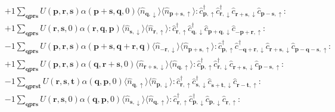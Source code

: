 \begin{align*}
	&+1 \sum_{ \mathbf{q} \mathbf{p} \mathbf{r} \mathbf{s} } U( \mathbf{p}, \mathbf{r}, \mathbf{s} )  \alpha( \mathbf{p}+\mathbf{s}, \mathbf{q}, 0 )   \langle \hat{n}_{ \mathbf{q}, \downarrow } \rangle \langle \hat{n}_{ \mathbf{p}+\mathbf{s}, \uparrow } \rangle :\hat{c}_{ \mathbf{p}, \uparrow }^\dagger \hat{c}_{ \mathbf{r}, \downarrow }^\dagger \hat{c}_{ \mathbf{r}+\mathbf{s}, \downarrow }^{\phantom{\dagger}}\hat{c}_{ \mathbf{p}-\mathbf{s}, \uparrow }^{\phantom{\dagger}}: \\
	&+1 \sum_{ \mathbf{q} \mathbf{p} \mathbf{r} \mathbf{s} } U( \mathbf{r}, \mathbf{s}, 0 )  \alpha( \mathbf{r}, \mathbf{q}, \mathbf{p} )   \langle \hat{n}_{ \mathbf{s}, \downarrow } \rangle \langle \hat{n}_{ \mathbf{r}, \uparrow } \rangle :\hat{c}_{ \mathbf{r}, \uparrow }^\dagger \hat{c}_{ \mathbf{q}, \downarrow }^\dagger \hat{c}_{ \mathbf{p}+\mathbf{q}, \downarrow }^{\phantom{\dagger}}\hat{c}_{ -\mathbf{p}+\mathbf{r}, \uparrow }^{\phantom{\dagger}}: \\
	&-1 \sum_{ \mathbf{q} \mathbf{p} \mathbf{r} \mathbf{s} } U( \mathbf{p}, \mathbf{r}, \mathbf{s} )  \alpha( \mathbf{p}+\mathbf{s}, \mathbf{q}+\mathbf{r}, \mathbf{q} )   \langle \hat{n}_{ -\mathbf{r}, \downarrow } \rangle \langle \hat{n}_{ \mathbf{p}+\mathbf{s}, \uparrow } \rangle :\hat{c}_{ \mathbf{p}, \uparrow }^\dagger \hat{c}_{ -\mathbf{q}+\mathbf{r}, \downarrow }^\dagger \hat{c}_{ \mathbf{r}+\mathbf{s}, \downarrow }^{\phantom{\dagger}}\hat{c}_{ \mathbf{p}-\mathbf{q}-\mathbf{s}, \uparrow }^{\phantom{\dagger}}: \\
	&+1 \sum_{ \mathbf{q} \mathbf{p} \mathbf{r} \mathbf{s} } U( \mathbf{p}, \mathbf{r}, \mathbf{s} )  \alpha( \mathbf{q}, \mathbf{r}+\mathbf{s}, 0 )   \langle \hat{n}_{ \mathbf{r}+\mathbf{s}, \downarrow } \rangle \langle \hat{n}_{ \mathbf{q}, \uparrow } \rangle :\hat{c}_{ \mathbf{p}, \uparrow }^\dagger \hat{c}_{ \mathbf{r}, \downarrow }^\dagger \hat{c}_{ \mathbf{r}+\mathbf{s}, \downarrow }^{\phantom{\dagger}}\hat{c}_{ \mathbf{p}-\mathbf{s}, \uparrow }^{\phantom{\dagger}}: \\
	&-1 \sum_{ \mathbf{q} \mathbf{p} \mathbf{r} \mathbf{s} \mathbf{t} } U( \mathbf{r}, \mathbf{s}, \mathbf{t} )  \alpha( \mathbf{q}, \mathbf{p}, 0 )   \langle \hat{n}_{ \mathbf{q}, \uparrow } \rangle \langle \hat{n}_{ \mathbf{p}, \downarrow } \rangle :\hat{c}_{ \mathbf{r}, \uparrow }^\dagger \hat{c}_{ \mathbf{s}, \downarrow }^\dagger \hat{c}_{ \mathbf{s}+\mathbf{t}, \downarrow }^{\phantom{\dagger}}\hat{c}_{ \mathbf{r}-\mathbf{t}, \uparrow }^{\phantom{\dagger}}: \\
	&-1 \sum_{ \mathbf{q} \mathbf{p} \mathbf{r} \mathbf{s} } U( \mathbf{r}, \mathbf{s}, 0 )  \alpha( \mathbf{q}, \mathbf{p}, 0 )   \langle \hat{n}_{ \mathbf{s}, \downarrow } \rangle \langle \hat{n}_{ \mathbf{q}, \uparrow } \rangle :\hat{c}_{ \mathbf{r}, \uparrow }^\dagger \hat{c}_{ \mathbf{p}, \downarrow }^\dagger \hat{c}_{ \mathbf{p}, \downarrow }^{\phantom{\dagger}}\hat{c}_{ \mathbf{r}, \uparrow }^{\phantom{\dagger}}: \\

\end{align*}
